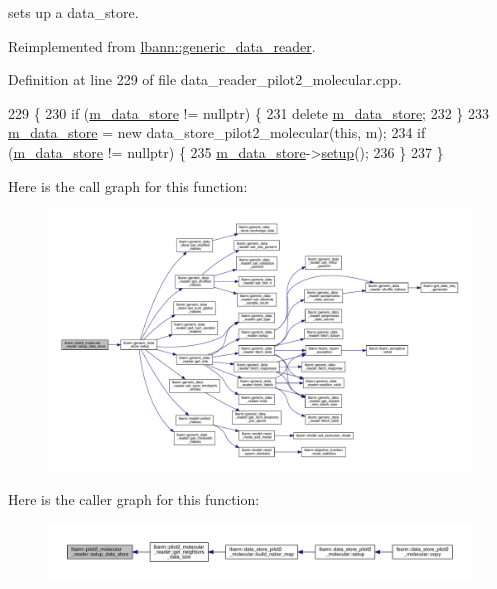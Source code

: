 sets up a data\+\_\+store. 



Reimplemented from \hyperlink{classlbann_1_1generic__data__reader_a8b2a09d38512fc11f1b9d572c89100a7}{lbann\+::generic\+\_\+data\+\_\+reader}.



Definition at line 229 of file data\+\_\+reader\+\_\+pilot2\+\_\+molecular.\+cpp.


\begin{DoxyCode}
229                                                        \{
230   \textcolor{keywordflow}{if} (\hyperlink{classlbann_1_1generic__data__reader_aefc076b842933a882214f4f709ca49c9}{m\_data\_store} != \textcolor{keyword}{nullptr}) \{
231     \textcolor{keyword}{delete} \hyperlink{classlbann_1_1generic__data__reader_aefc076b842933a882214f4f709ca49c9}{m\_data\_store};
232   \}
233   \hyperlink{classlbann_1_1generic__data__reader_aefc076b842933a882214f4f709ca49c9}{m\_data\_store} = \textcolor{keyword}{new} data\_store\_pilot2\_molecular(\textcolor{keyword}{this}, m);
234   \textcolor{keywordflow}{if} (\hyperlink{classlbann_1_1generic__data__reader_aefc076b842933a882214f4f709ca49c9}{m\_data\_store} != \textcolor{keyword}{nullptr}) \{
235     \hyperlink{classlbann_1_1generic__data__reader_aefc076b842933a882214f4f709ca49c9}{m\_data\_store}->\hyperlink{classlbann_1_1generic__data__store_a1cff17def02ee21b6ca0befeb04bb582}{setup}();
236   \}
237 \}
\end{DoxyCode}
Here is the call graph for this function\+:\nopagebreak
\begin{figure}[H]
\begin{center}
\leavevmode
\includegraphics[width=350pt]{classlbann_1_1pilot2__molecular__reader_a0c18335afe5625a7aa8b8275392c0317_cgraph}
\end{center}
\end{figure}
Here is the caller graph for this function\+:\nopagebreak
\begin{figure}[H]
\begin{center}
\leavevmode
\includegraphics[width=350pt]{classlbann_1_1pilot2__molecular__reader_a0c18335afe5625a7aa8b8275392c0317_icgraph}
\end{center}
\end{figure}


